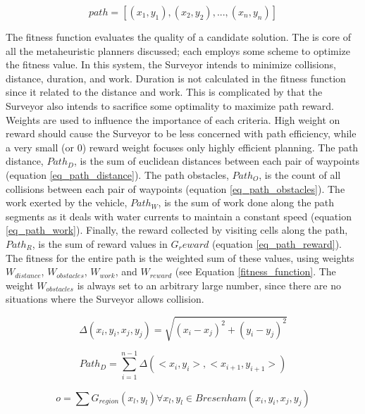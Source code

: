 \documentclass{tamuccthesis}
\begin{document}
\begin{equation}
path = [ (x_{1}, y_{1}), (x_{2}, y_{2}), ..., (x_{n}, y_{n}) ]
\label{solution_path}
\end{equation}

The fitness function evaluates the quality of a candidate solution. The is core of all the metaheuristic planners discussed; each employs some scheme to optimize the fitness value. In this system, the Surveyor intends to minimize collisions, distance, duration, and work. Duration is not calculated in the fitness function since it related to the distance and work. This is complicated by that the Surveyor also intends to sacrifice some optimality to maximize path reward. Weights are used to influence the importance of each criteria. High weight on reward should cause the Surveyor to be less concerned with path efficiency, while a very small (or 0) reward weight focuses only highly efficient planning. The path distance, $Path_D$, is the sum of euclidean distances between each pair of waypoints (equation \ref{eq_path_distance}). The path obstacles, $Path_O$, is the count of all collisions between each pair of waypoints (equation \ref{eq_path_obstacles}). The work exerted by the vehicle, $Path_W$, is the sum of work done along the path segments as it deals with water currents to maintain a constant speed (equation \ref{eq_path_work}). Finally, the reward collected by visiting cells along the path, $Path_R$, is the sum of reward values in $G_reward$ (equation \ref{eq_path_reward}). The fitness for the entire path is the weighted sum of these values, using weights $W_{distance}$, $W_{obstacles}$, $W_{work}$, and $W_{reward}$ (see Equation \ref{fitness_function}. The weight $W_{obstacles}$ is always set to an arbitrary large number, since there are no situations where the Surveyor allows collision. 

\begin{equation}
\Delta (x_{i}, y_{i}, x_{j}, y_{j}) = \sqrt{(x_{i} - x_{j})^2 + (y_{i} - y_{j})^2}
\label{eq_distance}
\end{equation}

\begin{equation}
Path_{D} = \sum_{i=1}^{n-1} \Delta (<x_{i}, y_{i}>, <x_{i+1}, y_{i+1}>)
\label{eq_path_distance}
\end{equation}


\begin{equation}
o = \sum G_{region}(x_l, y_l) \forall x_l, y_l \in Bresenham(x_i, y_i, x_j, y_j)
\label{eq_obstacles}
\end{equation}
\end{document}
